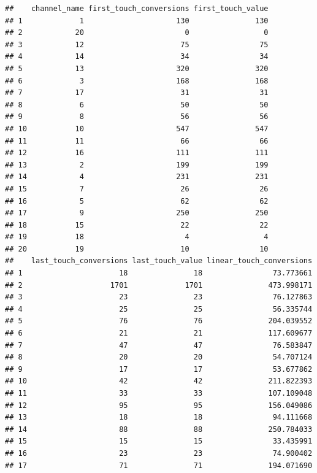 \documentclass[
]{book}
\begin{document}
\begin{verbatim}
##    channel_name first_touch_conversions first_touch_value
## 1             1                     130               130
## 2            20                       0                 0
## 3            12                      75                75
## 4            14                      34                34
## 5            13                     320               320
## 6             3                     168               168
## 7            17                      31                31
## 8             6                      50                50
## 9             8                      56                56
## 10           10                     547               547
## 11           11                      66                66
## 12           16                     111               111
## 13            2                     199               199
## 14            4                     231               231
## 15            7                      26                26
## 16            5                      62                62
## 17            9                     250               250
## 18           15                      22                22
## 19           18                       4                 4
## 20           19                      10                10
##    last_touch_conversions last_touch_value linear_touch_conversions
## 1                      18               18                73.773661
## 2                    1701             1701               473.998171
## 3                      23               23                76.127863
## 4                      25               25                56.335744
## 5                      76               76               204.039552
## 6                      21               21               117.609677
## 7                      47               47                76.583847
## 8                      20               20                54.707124
## 9                      17               17                53.677862
## 10                     42               42               211.822393
## 11                     33               33               107.109048
## 12                     95               95               156.049086
## 13                     18               18                94.111668
## 14                     88               88               250.784033
## 15                     15               15                33.435991
## 16                     23               23                74.900402
## 17                     71               71               194.071690

\end{verbatim}
\end{document}
